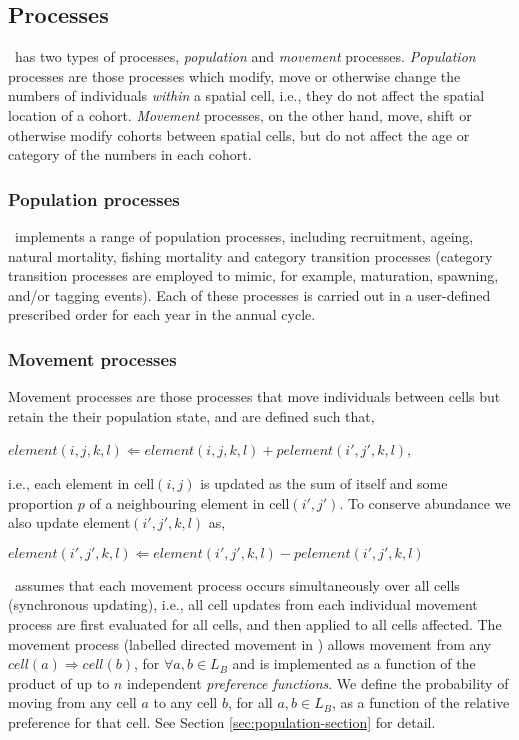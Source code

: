 \subsection{Processes}

\SPM\  has two types of processes, \emph{population} and \emph{movement} processes. \emph{Population} processes are those processes which modify, move or otherwise change the numbers of individuals \emph{within} a spatial cell, i.e., they do not affect the spatial location of a cohort. \emph{Movement} processes, on the other hand, move, shift or otherwise modify cohorts between spatial cells, but do not affect the age or category of the numbers in each cohort. 

\subsubsection{Population processes}

\SPM\ implements a range of population processes, including recruitment, ageing, natural mortality, fishing mortality and category transition processes (category transition processes are employed to mimic, for example, maturation, spawning, and/or tagging events). Each of these processes is carried out in a user-defined prescribed order for each year in the annual cycle.  

\subsubsection{Movement processes}

Movement processes are those processes that move individuals between cells but retain the their population state, and are defined such that,

$element(i,j,k,l)\Leftarrow element(i,j,k,l) + p element(i',j',k,l)$,

i.e., each element in cell$(i,j)$ is updated as the sum of itself and some proportion $p$ of a neighbouring element in cell$(i',j')$. To conserve abundance we also update element$(i',j',k,l)$ as,

$element(i',j',k,l)\Leftarrow element(i',j',k,l) - p element(i',j',k,l)$

\SPM\ assumes that each movement process occurs simultaneously over all cells (synchronous updating), i.e., all cell updates from each individual movement process are first evaluated for all cells, and then applied to all cells affected. The movement process (labelled directed movement in \SPM) allows movement from any $cell(a) \Rightarrow cell(b)$, for $\forall a,b \in L_B$ and is implemented as a function of the product of up to $n$ independent \emph{preference functions}. We define the probability of moving from any cell $a$ to any cell $b$, for all $a,b \in L_B$, as a function of the relative preference for that cell. See Section \ref{sec:population-section} for detail.

